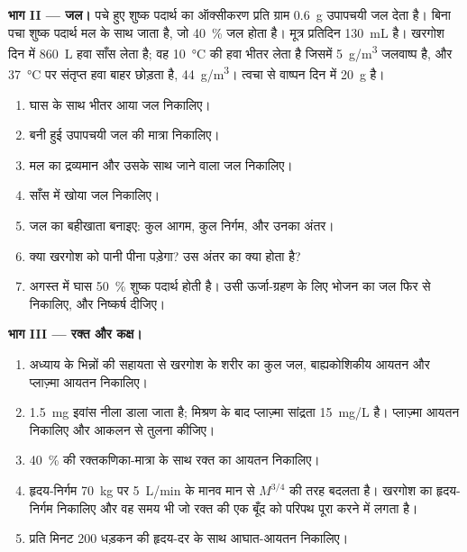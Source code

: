 \begin{problem}
\medskip
\noindent\textbf{भाग II --- जल।}
पचे हुए शुष्क पदार्थ का ऑक्सीकरण प्रति ग्राम \qty{0.6}{g} उपापचयी जल
देता है। बिना पचा शुष्क पदार्थ मल के साथ जाता है, जो \qty{40}{\%} जल
होता है। मूत्र प्रतिदिन \qty{130}{mL} है। खरगोश दिन में \qty{860}{L}
हवा साँस लेता है; वह \qty{10}{\celsius} की हवा भीतर लेता है जिसमें
\qty{5}{g/m^3} जलवाष्प है, और \qty{37}{\celsius} पर संतृप्त हवा बाहर
छोड़ता है, \qty{44}{g/m^3}। त्वचा से वाष्पन दिन में \qty{20}{g} है।
\begin{enumerate}[resume]
  \item घास के साथ भीतर आया जल निकालिए।
  \item बनी हुई उपापचयी जल की मात्रा निकालिए।
  \item मल का द्रव्यमान और उसके साथ जाने वाला जल निकालिए।
  \item साँस में खोया जल निकालिए।
  \item जल का बहीखाता बनाइए: कुल आगम, कुल निर्गम, और उनका अंतर।
  \item क्या खरगोश को पानी पीना पड़ेगा? उस अंतर का क्या होता है?
  \item अगस्त में घास \qty{50}{\%} शुष्क पदार्थ होती है। उसी
        ऊर्जा-ग्रहण के लिए भोजन का जल फिर से निकालिए, और निष्कर्ष
        दीजिए।
\end{enumerate}

\medskip
\noindent\textbf{भाग III --- रक्त और कक्ष।}
\begin{enumerate}[resume]
  \item अध्याय के भिन्नों की सहायता से खरगोश के शरीर का कुल जल,
        बाह्यकोशिकीय आयतन और प्लाज़्मा आयतन निकालिए।
  \item \qty{1.5}{mg} इवांस नीला डाला जाता है; मिश्रण के बाद प्लाज़्मा
        सांद्रता \qty{15}{mg/L} है। प्लाज़्मा आयतन निकालिए और आकलन से
        तुलना कीजिए।
  \item \qty{40}{\%} की रक्तकणिका-मात्रा के साथ रक्त का आयतन निकालिए।
  \item हृदय-निर्गम \qty{70}{kg} पर \qty{5}{L/min} के मानव मान से
        $M^{3/4}$ की तरह बदलता है। खरगोश का हृदय-निर्गम निकालिए और वह
        समय भी जो रक्त की एक बूँद को परिपथ पूरा करने में लगता है।
  \item प्रति मिनट \qty{200}{} धड़कन की हृदय-दर के साथ आघात-आयतन
        निकालिए।
\end{enumerate}


\end{problem}
